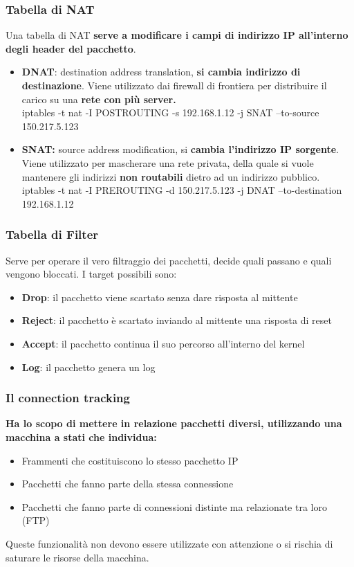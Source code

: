 \documentclass[12pt]{article}
\begin{document}
			\subsubsection{Tabella di NAT}
				Una tabella di NAT \textbf{serve a modificare i campi di indirizzo IP all'interno degli header del pacchetto}.
					\begin{itemize}
						\item \textbf{DNAT}: destination address translation, \textbf{si cambia indirizzo di destinazione}. Viene utilizzato dai firewall di frontiera per distribuire il carico su una \textbf{rete con più server.}\\
						iptables -t nat -I POSTROUTING -s 192.168.1.12 -j SNAT –to-source
						150.217.5.123
						\item \textbf{SNAT:} source address modification, si \textbf{cambia l'indirizzo IP sorgente}. Viene utilizzato per mascherare una rete privata, della quale si vuole mantenere gli indirizzi \textbf{non routabili} dietro ad un indirizzo pubblico.\\
						iptables -t nat -I PREROUTING -d 150.217.5.123 -j DNAT –to-destination
						192.168.1.12
					\end{itemize}
			\subsubsection{Tabella di Filter}
				Serve per operare il vero filtraggio dei pacchetti, decide quali passano e quali vengono bloccati. I target possibili sono:
				\begin{itemize}
					\item \textbf{Drop}: il pacchetto viene scartato senza dare risposta al mittente
					\item \textbf{Reject}: il pacchetto è scartato inviando al mittente una risposta di reset
					\item \textbf{Accept}: il pacchetto continua il suo percorso all'interno del kernel
					\item \textbf{Log}: il pacchetto genera un log	
				\end{itemize}
			\subsubsection{Il connection tracking}
				\textbf{Ha lo scopo di mettere in relazione pacchetti diversi, utilizzando una macchina a stati che individua:}
				\begin{itemize}
					\item Frammenti che costituiscono lo stesso pacchetto IP
					\item Pacchetti che fanno parte della stessa connessione
					\item Pacchetti che fanno parte di connessioni distinte ma relazionate tra loro (FTP)
				\end{itemize}
				Queste funzionalità non devono essere utilizzate con attenzione o si rischia di saturare le risorse della macchina.\\
				
\end{document}
